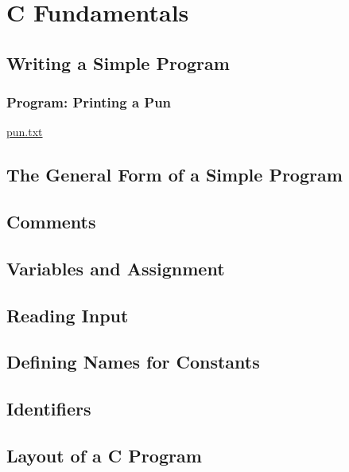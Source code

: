 \documentclass[../main.tex]{subfiles}
\begin{document}
\section{C Fundamentals}

\subsection{Writing a Simple Program}
\subsubsection*{Program: Printing a Pun}

\href{run:.code/a.out}{pun.txt}

\subsection{The General Form of a Simple Program}

\subsection{Comments}

\subsection{Variables and Assignment}

\subsection{Reading Input}

\subsection{Defining Names for Constants}

\subsection{Identifiers}

\subsection{Layout of a C Program}
\end{document}
